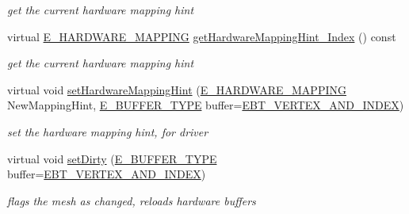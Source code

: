 \begin{DoxyCompactItemize}
\begin{DoxyCompactList}\small\item\em get the current hardware mapping hint \end{DoxyCompactList}\item 
\mbox{\label{structirr_1_1scene_1_1SSharedMeshBuffer_a443fddc1430e9e340f339ec7292a86c4}} 
virtual \hyperlink{namespaceirr_1_1scene_ac7d8ee8d77da75f2580bb9bb17231c27}{E\+\_\+\+H\+A\+R\+D\+W\+A\+R\+E\+\_\+\+M\+A\+P\+P\+I\+NG} \hyperlink{structirr_1_1scene_1_1SSharedMeshBuffer_a443fddc1430e9e340f339ec7292a86c4}{get\+Hardware\+Mapping\+Hint\+\_\+\+Index} () const
\begin{DoxyCompactList}\small\item\em get the current hardware mapping hint \end{DoxyCompactList}\item 
\mbox{\label{structirr_1_1scene_1_1SSharedMeshBuffer_a0e0927ba679258099697688ac123af88}} 
virtual void \hyperlink{structirr_1_1scene_1_1SSharedMeshBuffer_a0e0927ba679258099697688ac123af88}{set\+Hardware\+Mapping\+Hint} (\hyperlink{namespaceirr_1_1scene_ac7d8ee8d77da75f2580bb9bb17231c27}{E\+\_\+\+H\+A\+R\+D\+W\+A\+R\+E\+\_\+\+M\+A\+P\+P\+I\+NG} New\+Mapping\+Hint, \hyperlink{namespaceirr_1_1scene_a8f59a89ffef0ad8e5b2c2cb874a93e8c}{E\+\_\+\+B\+U\+F\+F\+E\+R\+\_\+\+T\+Y\+PE} buffer=\hyperlink{namespaceirr_1_1scene_a8f59a89ffef0ad8e5b2c2cb874a93e8ca34ea664123fbc28610408e51b014dcdd}{E\+B\+T\+\_\+\+V\+E\+R\+T\+E\+X\+\_\+\+A\+N\+D\+\_\+\+I\+N\+D\+EX})
\begin{DoxyCompactList}\small\item\em set the hardware mapping hint, for driver \end{DoxyCompactList}\item 
\mbox{\label{structirr_1_1scene_1_1SSharedMeshBuffer_ab49d4330e436e4e841e28aa867038e22}} 
virtual void \hyperlink{structirr_1_1scene_1_1SSharedMeshBuffer_ab49d4330e436e4e841e28aa867038e22}{set\+Dirty} (\hyperlink{namespaceirr_1_1scene_a8f59a89ffef0ad8e5b2c2cb874a93e8c}{E\+\_\+\+B\+U\+F\+F\+E\+R\+\_\+\+T\+Y\+PE} buffer=\hyperlink{namespaceirr_1_1scene_a8f59a89ffef0ad8e5b2c2cb874a93e8ca34ea664123fbc28610408e51b014dcdd}{E\+B\+T\+\_\+\+V\+E\+R\+T\+E\+X\+\_\+\+A\+N\+D\+\_\+\+I\+N\+D\+EX})
\begin{DoxyCompactList}\small\item\em flags the mesh as changed, reloads hardware buffers \end{DoxyCompactList}\item 

\end{DoxyCompactItemize}
